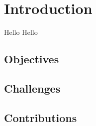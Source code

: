 \chapter{Introduction}
Hello \cite{greenwade93}
Hello \cite{lamport94}
\section{Objectives}
\section{Challenges}
\section{Contributions}